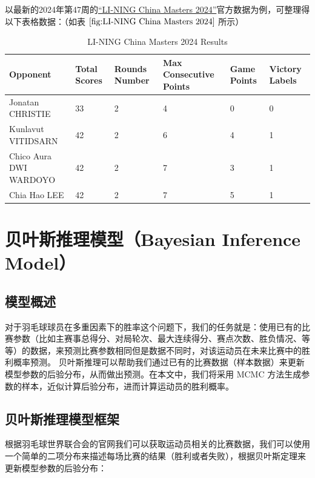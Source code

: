 \documentclass[12pt]{article}
\begin{document}
以最新的2024年第47周的\href{https://bwfbadminton.com/zh-cn/player/57945/shi-yu-qi/}{“LI-NING China Masters 2024”}官方数据为例，可整理得以下表格数据：（如表 $\ref{fig:LI-NING China Masters 2024}$ 所示）
\begin{table}[h!]
	\centering
	\begin{tabularx}{\textwidth}{|l|X|X|X|X|X|}
	\hline
	\textbf{Opponent} & \textbf{Total Scores} & \textbf{Rounds Number} & \textbf{Max Consecutive Points} & \textbf{Game Points} & \textbf{Victory Labels} \\
	\hline
	Jonatan CHRISTIE & 33 & 2 & 4 & 0 & 0 \\
	Kunlavut VITIDSARN & 42 & 2 & 6 & 4 & 1 \\
	Chico Aura DWI WARDOYO & 42 & 2 & 7 & 3 & 1 \\
	Chia Hao LEE & 42 & 2 & 7 & 5 & 1 \\
	\hline
	\end{tabularx}
	\caption{LI-NING China Masters 2024 Results}
	\label{fig:LI-NING China Masters 2024}
\end{table}


\section{贝叶斯推理模型（Bayesian Inference Model）}

\subsection{模型概述}

对于羽毛球球员在多重因素下的胜率这个问题下，我们的任务就是：使用已有的比赛参数（比如主赛事总得分、对局轮次、最大连续得分、赛点次数、胜负情况、等等）的数据，来预测比赛参数相同但是数据不同时，对该运动员在未来比赛中的胜利概率预测。
贝叶斯推理可以帮助我们通过已有的比赛数据（样本数据）来更新模型参数的后验分布，从而做出预测。在本文中，我们将采用 MCMC 方法生成参数的样本，近似计算后验分布，进而计算运动员的胜利概率。

\subsection{贝叶斯推理模型框架}
根据羽毛球世界联合会的官网我们可以获取运动员相关的比赛数据，我们可以使用一个简单的二项分布来描述每场比赛的结果（胜利或者失败），根据贝叶斯定理来更新模型参数的后验分布：
\end{document}
